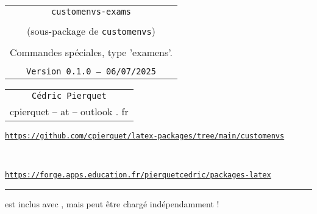 \documentclass[french,11pt,a4paper]{article}
\def\TPversion{0.1.0}
\def\TPdate{06/07/2025}
\begin{document}
\pagestyle{fancy}

\thispagestyle{empty}

\begin{center}
	\begin{minipage}{0.88\linewidth}
	\begin{tcolorbox}[colframe=yellow,colback=yellow!15]
		\begin{center}
			\begin{tabular}{c}
				{\Huge \texttt{customenvs-exams}} \\
				\\
				{\LARGE (sous-package de \texttt{customenvs})}\\
				\\
				{\LARGE Commandes spéciales, type 'examens'.} \\
				\\
				{\small \texttt{Version \TPversion{} -- \TPdate}}
		\end{tabular}
		\end{center}
	\end{tcolorbox}
\end{minipage}
\end{center}

\begin{center}
	\begin{tabular}{c}
		\texttt{Cédric Pierquet}\\
		{\ttfamily cpierquet -- at -- outlook . fr}
	\end{tabular}
\end{center}

\begin{center}
	\begin{minipage}{0.85\linewidth}
		\begin{tcolorbox}[colframe=teal,colback=teal!10,halign=center,fontupper=\footnotesize]
			\texttt{\url{https://github.com/cpierquet/latex-packages/tree/main/customenvs}}
			
			~
			
			\texttt{\url{https://forge.apps.education.fr/pierquetcedric/packages-latex}}
		\end{tcolorbox}
	\end{minipage}
\end{center}

\vspace*{1.25cm}

\hrule

\medskip

\hfill{} est inclus avec , mais peut être chargé indépendamment !\hfill\null
\end{document}
